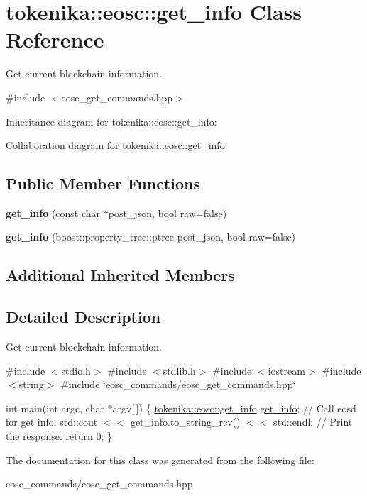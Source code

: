 \hypertarget{classtokenika_1_1eosc_1_1get__info}{}\section{tokenika\+:\+:eosc\+:\+:get\+\_\+info Class Reference}
\label{classtokenika_1_1eosc_1_1get__info}


Get current blockchain information.  




{\ttfamily \#include $<$eosc\+\_\+get\+\_\+commands.\+hpp$>$}



Inheritance diagram for tokenika\+:\+:eosc\+:\+:get\+\_\+info\+:


Collaboration diagram for tokenika\+:\+:eosc\+:\+:get\+\_\+info\+:
\subsection*{Public Member Functions}
\begin{DoxyCompactItemize}
\item 
\mbox{\label{classtokenika_1_1eosc_1_1get__info_a599f4636f791bdba2a6a34ead1b33823}} 
{\bfseries get\+\_\+info} (const char $\ast$post\+\_\+json, bool raw=false)
\item 
\mbox{\label{classtokenika_1_1eosc_1_1get__info_a914fda993ac1eb04e30bddac398d9253}} 
{\bfseries get\+\_\+info} (boost\+::property\+\_\+tree\+::ptree post\+\_\+json, bool raw=false)
\end{DoxyCompactItemize}
\subsection*{Additional Inherited Members}


\subsection{Detailed Description}
Get current blockchain information. 

\#include $<$stdio.\+h$>$ \#include $<$stdlib.\+h$>$ \#include $<$iostream$>$ \#include $<$string$>$ \#include \char`\"{}eosc\+\_\+commands/eosc\+\_\+get\+\_\+commands.\+hpp\char`\"{}

int main(int argc, char $\ast$argv\mbox{[}$\,$\mbox{]}) \{ \hyperlink{classtokenika_1_1eosc_1_1get__info}{tokenika\+::eosc\+::get\+\_\+info} \hyperlink{classtokenika_1_1eosc_1_1get__info}{get\+\_\+info}; // Call \textquotesingle{}eosd\textquotesingle{} for \textquotesingle{}get info\textquotesingle{}. std\+::cout $<$$<$ get\+\_\+info.\+to\+\_\+string\+\_\+rcv() $<$$<$ std\+::endl; // Print the response. return 0; \} 

The documentation for this class was generated from the following file\+:\begin{DoxyCompactItemize}
\item 
eosc\+\_\+commands/eosc\+\_\+get\+\_\+commands.\+hpp\end{DoxyCompactItemize}
